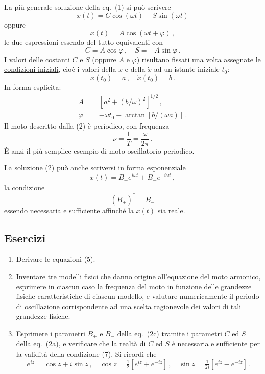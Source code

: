 \documentclass[11pt, a4paper]{book}
\numberwithin{equation}{section}
\newenvironment{esercizi}{\subsection*{Esercizi}\begin{enumerate}}{\end{enumerate}}
\begin{document}
La più generale soluzione della eq.~(1) si può scrivere
\begin{equation}
    x(t) = C \cos(\omega t) + S \sin(\omega t) \tag{2a}
\end{equation}
oppure
\begin{equation}
    x(t) = A \cos(\omega t + \varphi) \,, \tag{2b}
\end{equation}
le due espressioni essendo del tutto equivalenti con
\begin{equation}
    C = A \cos\varphi \,, \quad S = -A \sin\varphi \,.
\end{equation}
I valori delle costanti $C$ e $S$ (oppure $A$ e $\varphi$) risultano fissati una volta assegnate le \underline{condizioni iniziali}, cioè i valori della $x$ e della $\dot{x}$ ad un istante iniziale $t_0$:
\begin{equation}
    x(t_0) = a \,, \quad \dot{x}(t_0) = b \,.
\end{equation}
In forma esplicita:
\begin{align}
    A &= \left[ a^2 + (b/\omega)^2 \right]^{1/2} \,, \tag{5a} \\
    \varphi &= -\omega t_0 - \arctan\left[ b/(\omega a) \right] \,. \tag{5b}
\end{align}
Il moto descritto dalla (2) è periodico, con frequenza
\begin{equation}
    \nu = \frac{1}{T} = \frac{\omega}{2\pi} \,.
\end{equation}
È anzi il più semplice esempio di moto oscillatorio periodico.

La soluzione (2) può anche scriversi in forma esponenziale
\begin{equation}
    x(t) = B_+ e^{i\omega t} + B_- e^{-i\omega t} \,, \tag{2c}
\end{equation}
la condizione
\begin{equation}
    \left( B_+ \right)^* = B_-
\end{equation}
essendo necessaria e sufficiente affinché la $x(t)$ sia reale.

\begin{esercizi}
    \item Derivare le equazioni (5).
    \item Inventare tre modelli fisici che danno origine all'equazione del moto armonico, esprimere in ciascun caso la frequenza del moto in funzione delle grandezze fisiche caratteristiche di ciascun modello, e valutare numericamente il periodo di oscillazione corrispondente ad una scelta ragionevole dei valori di tali grandezze fisiche.
    \item Esprimere i parametri $B_+$ e $B_-$ della eq.~(2c) tramite i parametri $C$ ed $S$ della eq.~(2a), e verificare che la realtà di $C$ ed $S$ è necessaria e sufficiente per la validità della condizione (7). Si ricordi che
    \[
        e^{iz} = \cos z + i \sin z \,, \quad
        \cos z = \tfrac{1}{2}\left[ e^{iz} + e^{-iz} \right] \,, \quad
        \sin z = \tfrac{1}{2i}\left[ e^{iz} - e^{-iz} \right] \,.
    \]
\end{esercizi}
\end{document}
